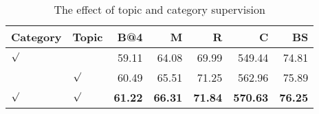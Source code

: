 \begin{table}[ht]
\centering
\small
\caption{The effect of topic and category supervision}
\label{tab:classify}
\begin{tabular}{llrrrrr}
\toprule
Category & Topic & B@4 & M & R & C & BS \\
\midrule
$\surd$ &  & 59.11 & 64.08 & 69.99 & 549.44 & 74.81 \\
 & $\surd$ & 60.49 & 65.51 & 71.25 & 562.96 & 75.89 \\
$\surd$ & $\surd$ & \textbf{61.22} & \textbf{66.31} & \textbf{71.84} & \textbf{570.63} & \textbf{76.25} \\
\bottomrule
\end{tabular}
\end{table}
